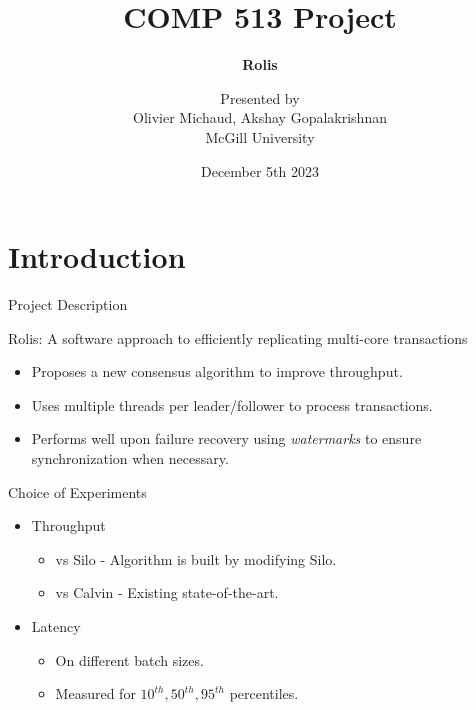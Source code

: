 \documentclass[xcolor=dvipsnames]{beamer}
\title{COMP 513 Project}
\subtitle{\textbf{Rolis}}
\date{December 5th 2023}
\author{Presented by \\ Olivier Michaud, Akshay Gopalakrishnan \\ McGill University}
\begin{document}
    \begin{frame}

        \maketitle

    \end{frame}

    \section{Introduction}

    \begin{frame}{Project Description}


        \begin{center}
            Rolis: A software approach to efficiently replicating multi-core transactions 
        \end{center}


        \begin{itemize}
            \item Proposes a new consensus algorithm to improve throughput. 
            \item Uses multiple threads per leader/follower to process transactions. 
            \item Performs well upon failure recovery using \textit{watermarks} to ensure synchronization when necessary.
        \end{itemize}

    \end{frame}

    \begin{frame}{Choice of Experiments}

        \begin{itemize}
            \item Throughput
            \begin{itemize}
                \item vs Silo - Algorithm is built by modifying Silo.  
                \item vs Calvin - Existing state-of-the-art. 
            \end{itemize}    
            \item Latency
            \begin{itemize}
                \item On different batch sizes.  
                \item Measured for $10^{th}, 50^{th}, 95^{th}$ percentiles.
            \end{itemize}         
        \end{itemize}
        
    \end{frame}
\end{document}
